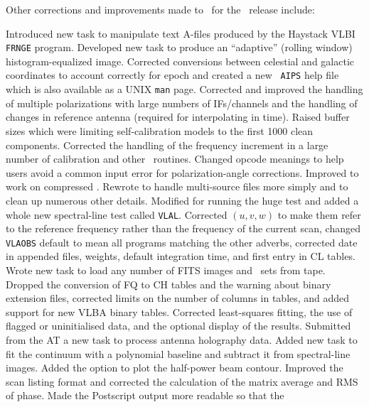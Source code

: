 Other corrections and improvements made to \AIPS\ for the
\RELEASENAME\ release include:
\begin{description}
 Introduced new task to manipulate text A-files produced
   by the Haystack VLBI {\tt FRNGE} program.
 Developed new task to produce an ``adaptive'' (rolling
   window) histogram-equalized image.
 Corrected conversions between celestial and galactic
   coordinates to account correctly for epoch and created a new {\tt
   AIPS} help file which is also available as a UNIX {\tt man} page.
 Corrected and improved the handling of multiple
   polarizations with large numbers of IFs/channels and the handling
   of changes in reference antenna (required for interpolating in
   time).
 Raised buffer sizes which were limiting
   self-calibration models to the first 1000 clean components.
 Corrected the handling of the frequency increment in a
   large number of calibration and other \uvdata\ routines.
 Changed opcode meanings to help users avoid a common
   input error for polarization-angle corrections.
 Improved to work on compressed \uvdata.
 Rewrote to handle multi-source files more simply and
   to clean up numerous other details.
 Modified for running the huge test and added a whole new
   spectral-line test called {\tt VLAL}.
 Corrected $(u,v,w)$ to make them refer to the reference
   frequency rather than the frequency of the current scan, changed
   {\tt VLAOBS} default to mean all programs matching the other
   adverbs, corrected date in appended files, weights, default
   integration time, and first entry in CL tables.
 Wrote new task to load any number of FITS images and
   \uvdata\ sets from tape.
 Dropped the conversion of FQ to CH tables and the
   warning about binary extension files, corrected limits on the
   number of columns in tables, and added support for new VLBA binary
   tables.
 Corrected least-squares fitting, the use of flagged or
   uninitialised data, and the optional display of the results.
 Submitted from the AT a new task to process antenna
   holography data.
 Added new task to fit the continuum with a polynomial
   baseline and subtract it from spectral-line images.
 Added the option to plot the half-power beam contour.
 Improved the scan listing format and corrected the
   calculation of the matrix average and RMS of phase.
 Made the Postscript output more readable so that the

\end{description}
